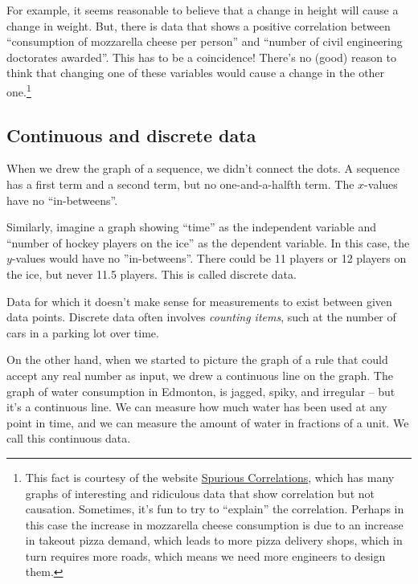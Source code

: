 For example, it seems reasonable to believe that a change in height will cause a change in weight. But, there is data that shows a positive correlation between ``consumption of mozzarella cheese per person'' and ``number of civil engineering doctorates awarded''. This has to be a coincidence! There's no (good) reason to think that changing one of these variables would cause a change in the other one.\footnote{This fact is courtesy of the website \href{http://www.tylervigen.com/view_correlation?id=3890}{Spurious Correlations}, which has many graphs of interesting and ridiculous data that show correlation but not causation. Sometimes, it's fun to try to ``explain'' the correlation. Perhaps in this case the increase in mozzarella cheese consumption is due to an increase in takeout pizza demand, which leads to more pizza delivery shops, which in turn requires more roads, which means we need more engineers to design them.}

\subsection{Continuous and discrete data}

When we drew the graph of a sequence, we didn't connect the dots. A sequence has a first term and a second term, but no one-and-a-halfth term. The $x$-values have no ``in-betweens''.

Similarly, imagine a graph showing ``time'' as the independent variable and ``number of hockey players on the ice'' as the dependent variable. In this case, the $y$-values would have no ''in-betweens''. There could be 11 players or 12 players on the ice, but never 11.5 players. This is called \gls{discrete data}.

\begin{boxdef}
Data for which it doesn't make sense for measurements to exist between given data points. Discrete data often involves \textit{counting items}, such at the number of cars in a parking lot over time. 
\end{boxdef}

On the other hand, when we started to picture the graph of a rule that could accept any real number as input, we drew a continuous line on the graph. The graph of water consumption in Edmonton, is jagged, spiky, and irregular -- but it's a continuous line. We can measure how much water has been used at any point in time, and we can measure the amount of water in fractions of a unit. We call this \gls{continuous data}.

